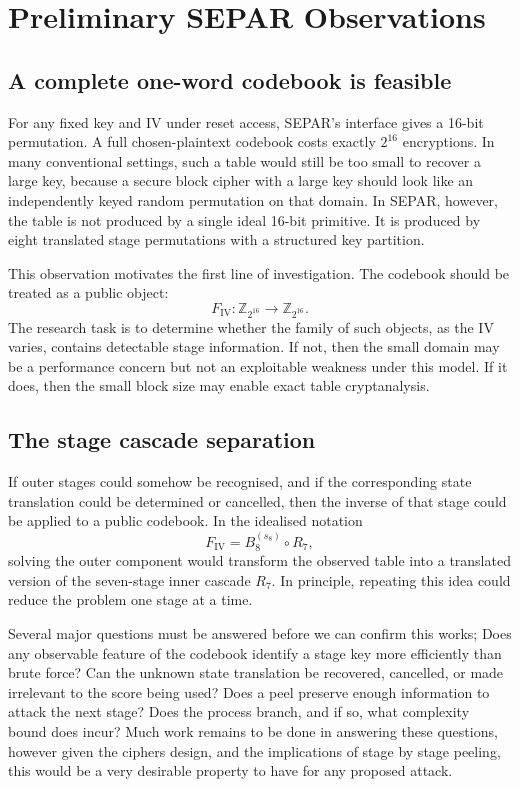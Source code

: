 \documentclass[11pt]{article}
\newcommand{\Z}[1]{\mathbb{Z}_{#1}}
\begin{document}
\section{Preliminary SEPAR Observations}

\subsection{A complete one-word codebook is feasible}

For any fixed key and IV under reset access, SEPAR's interface gives a 16-bit permutation. A full chosen-plaintext codebook costs exactly $2^{16}$ encryptions. In many conventional settings, such a table would still be too small to recover a large key, because a secure block cipher with a large key should look like an independently keyed random permutation on that domain. In SEPAR, however, the table is not produced by a single ideal 16-bit primitive. It is produced by eight translated stage permutations with a structured key partition.

This observation motivates the first line of investigation. The codebook should be treated as a public object:
\[
F_{\mathrm{IV}}:\Z{2^{16}}\to\Z{2^{16}}.
\]
The research task is to determine whether the family of such objects, as the IV varies, contains detectable stage information. If not, then the small domain may be a performance concern but not an exploitable weakness under this model. If it does, then the small block size may enable exact table cryptanalysis.

\subsection{The stage cascade separation}

If outer stages could somehow be recognised, and if the corresponding state translation could be determined or cancelled, then the inverse of that stage could be applied to a public codebook. In the idealised notation
\[
F_{\mathrm{IV}}=B_8^{(s_8)}\circ R_7,
\]
solving the outer component would transform the observed table into a translated version of the seven-stage inner cascade $R_7$. In principle, repeating this idea could reduce the problem one stage at a time.

Several major questions must be answered before we can confirm this works; Does any observable feature of the codebook identify a stage key more efficiently than brute force? Can the unknown state translation be recovered, cancelled, or made irrelevant to the score being used? Does a peel preserve enough information to attack the next stage? Does the process branch, and if so, what complexity bound does incur? Much work remains to be done in answering these questions, however given the ciphers design, and the implications of stage by stage peeling, this would be a very desirable property to have for any proposed attack.
\end{document}
